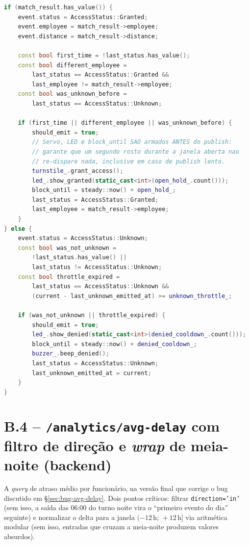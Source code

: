 \documentclass[12pt,a4paper]{report}
\begin{document}
\begin{lstlisting}[language=C++,caption={edge/src/pipeline/pipeline.cpp (trecho)},label={lst:pipeline}]
if (match_result.has_value()) {
    event.status = AccessStatus::Granted;
    event.employee = match_result->employee;
    event.distance = match_result->distance;

    const bool first_time = !last_status.has_value();
    const bool different_employee =
        last_status == AccessStatus::Granted &&
        last_employee != match_result->employee;
    const bool was_unknown_before =
        last_status == AccessStatus::Unknown;

    if (first_time || different_employee || was_unknown_before) {
        should_emit = true;
        // Servo, LED e block_until SAO armados ANTES do publish:
        // garante que um segundo rosto durante a janela aberta nao
        // re-dispare nada, inclusive em caso de publish lento.
        turnstile_.grant_access();
        led_.show_granted(static_cast<int>(open_hold_.count()));
        block_until = steady::now() + open_hold_;
        last_status = AccessStatus::Granted;
        last_employee = match_result->employee;
    }
} else {
    event.status = AccessStatus::Unknown;
    const bool was_not_unknown =
        !last_status.has_value() ||
        last_status != AccessStatus::Unknown;
    const bool throttle_expired =
        last_status == AccessStatus::Unknown &&
        (current - last_unknown_emitted_at) >= unknown_throttle_;

    if (was_not_unknown || throttle_expired) {
        should_emit = true;
        led_.show_denied(static_cast<int>(denied_cooldown_.count()));
        block_until = steady::now() + denied_cooldown_;
        buzzer_.beep_denied();
        last_status = AccessStatus::Unknown;
        last_unknown_emitted_at = current;
    }
}
\end{lstlisting}

\section*{B.4 -- \texttt{/analytics/avg-delay} com filtro de direção
e \textit{wrap} de meia-noite (backend)}

A \textit{query} de atraso médio por funcionário, na versão final que
corrige o bug discutido em §\ref{sec:bug-avg-delay}. Dois pontos críticos: filtrar
\texttt{direction='in'} (sem isso, a saída das 06:00 do turno noite
vira o ``primeiro evento do dia'' seguinte) e normalizar o delta
para a janela $(-12\,\mathrm{h};\,+12\,\mathrm{h}]$ via aritmética
modular (sem isso, entradas que cruzam a meia-noite produzem valores
absurdos).
\end{document}
